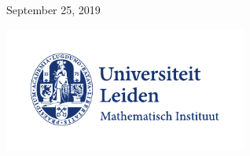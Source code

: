 	
	\vfill %
	
	{\large September 25, 2019} %
	
	
	\vfill
	\includegraphics[width=0.6\textwidth]{logo.pdf}\\[1cm] %
	 
	
	\vfill %